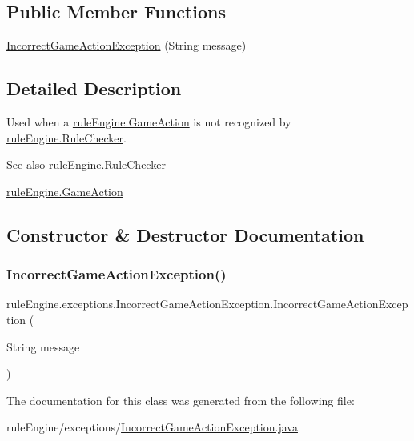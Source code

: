 \subsection*{Public Member Functions}
\begin{DoxyCompactItemize}
\item 
\mbox{\hyperlink{classrule_engine_1_1exceptions_1_1_incorrect_game_action_exception_a1420a042501bd21621f886036197f030}{Incorrect\+Game\+Action\+Exception}} (String message)
\end{DoxyCompactItemize}


\subsection{Detailed Description}
Used when a \mbox{\hyperlink{classrule_engine_1_1_game_action}{rule\+Engine.\+Game\+Action}} is not recognized by \mbox{\hyperlink{classrule_engine_1_1_rule_checker}{rule\+Engine.\+Rule\+Checker}}.

\begin{DoxySeeAlso}{See also}
\mbox{\hyperlink{classrule_engine_1_1_rule_checker}{rule\+Engine.\+Rule\+Checker}} 

\mbox{\hyperlink{classrule_engine_1_1_game_action}{rule\+Engine.\+Game\+Action}} 
\end{DoxySeeAlso}


\subsection{Constructor \& Destructor Documentation}
\mbox{\label{classrule_engine_1_1exceptions_1_1_incorrect_game_action_exception_a1420a042501bd21621f886036197f030}} 
\subsubsection{\texorpdfstring{Incorrect\+Game\+Action\+Exception()}{IncorrectGameActionException()}}
{\footnotesize\ttfamily rule\+Engine.\+exceptions.\+Incorrect\+Game\+Action\+Exception.\+Incorrect\+Game\+Action\+Exception (\begin{DoxyParamCaption}\item[{String}]{message }\end{DoxyParamCaption})\hspace{0.3cm}{\ttfamily [inline]}}



The documentation for this class was generated from the following file\+:\begin{DoxyCompactItemize}
\item 
rule\+Engine/exceptions/\mbox{\hyperlink{_incorrect_game_action_exception_8java}{Incorrect\+Game\+Action\+Exception.\+java}}\end{DoxyCompactItemize}
